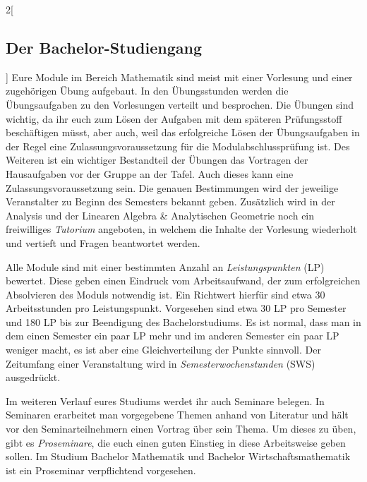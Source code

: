 \begin{multicols}{2}[\subsection{Der Bachelor-Studiengang}]
Eure Module im Bereich Mathematik sind meist mit einer Vorlesung und einer
zugehörigen Übung aufgebaut.  In den Übungsstunden werden die Übungsaufgaben zu
den Vorlesungen verteilt und besprochen.  Die Übungen sind wichtig, da ihr euch
zum Lösen der Aufgaben mit dem späteren Prüfungsstoff beschäftigen müsst, aber
auch, weil das erfolgreiche Lösen der Übungsaufgaben in der Regel eine
Zulassungsvoraussetzung für die Modulabschlussprüfung ist.  Des Weiteren ist
ein wichtiger Bestandteil der Übungen das Vortragen der Hausaufgaben vor der
Gruppe an der Tafel.  Auch dieses kann eine Zulassungsvoraussetzung sein. Die
genauen Bestimmungen wird der jeweilige Veranstalter zu Beginn des Semesters
bekannt geben.  Zusätzlich wird in der Analysis und der Linearen Algebra \&
Analytischen Geometrie noch ein freiwilliges \emph{Tutorium} angeboten, in
welchem die Inhalte der Vorlesung wiederholt und vertieft und Fragen
beantwortet werden.

Alle Module sind mit einer bestimmten Anzahl an \emph{Leistungspunkten} (LP)
bewertet. Diese geben einen Eindruck vom Arbeitsaufwand, der zum erfolgreichen
Absolvieren des Moduls notwendig ist. Ein Richtwert hierfür sind etwa 30
Arbeitsstunden pro Leistungspunkt.  Vorgesehen sind etwa 30 LP pro Semester und
180 LP bis zur Beendigung des Bachelorstudiums.  Es ist normal, dass man in dem
einen Semester ein paar LP mehr und im anderen Semester ein paar LP weniger
macht, es ist aber eine Gleichverteilung der Punkte sinnvoll.  Der Zeitumfang
einer Veranstaltung wird in \emph{Semesterwochenstunden} (SWS) ausgedrückt.

Im weiteren Verlauf eures Studiums werdet ihr auch Seminare belegen.  In
Seminaren erarbeitet man vorgegebene Themen anhand von Literatur und hält vor
den Seminarteilnehmern einen Vortrag über sein Thema.  Um dieses zu üben, gibt
es \emph{Proseminare}, die euch einen guten Einstieg in diese Arbeitsweise
geben sollen. Im Studium Bachelor Mathematik und Bachelor Wirtschaftsmathematik
ist ein Proseminar verpflichtend vorgesehen. 
\end{multicols}

\clearpage

